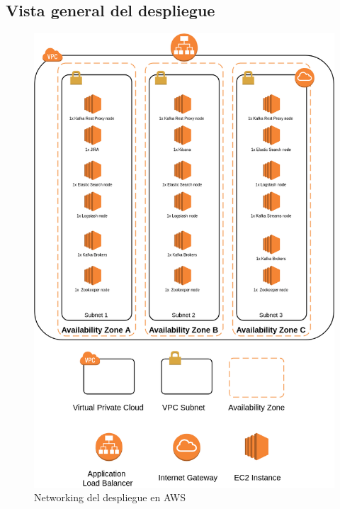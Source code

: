 \subsection{Vista general del despliegue}\label{cap:networking}

\begin{figure}[!htb]
	\includegraphics[width=\linewidth] {Moduloss-netdeploy.png}
	\caption{Networking del despliegue en AWS}
	\label{fig:networking1}
\end{figure}

